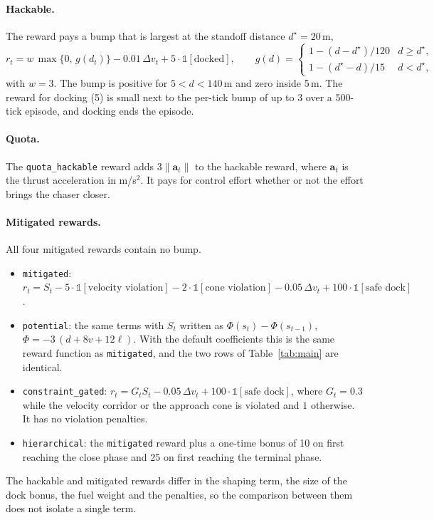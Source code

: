 \documentclass[11pt]{article}
\begin{document}
\paragraph{Hackable.} The reward pays a bump that is largest at the standoff distance
$d^\star=20$\,m,
\begin{equation}
r_t = w\,\max\{0,\,g(d_t)\} - 0.01\,\Delta v_t + 5\cdot\mathbb 1[\text{docked}],
\qquad
g(d)=\begin{cases}
1-(d-d^\star)/120 & d\ge d^\star,\\
1-(d^\star-d)/15 & d<d^\star,
\end{cases}
\end{equation}
with $w=3$. The bump is positive for $5<d<140$\,m and zero inside 5\,m. The
reward for docking (5) is small next to the per-tick bump of up to 3 over a
500-tick episode, and docking ends the episode.

\paragraph{Quota.} The \texttt{quota\_hackable} reward adds $3\lVert\mathbf a_t\rVert$ to the hackable reward,
where $\mathbf a_t$ is the thrust acceleration in m/s$^2$. It pays for control
effort whether or not the effort brings the chaser closer.

\paragraph{Mitigated rewards.} All four mitigated rewards contain no bump.
\begin{itemize}
  \item \texttt{mitigated}: $r_t = S_t - 5\cdot\mathbb 1[\text{velocity violation}] - 2\cdot\mathbb 1[\text{cone violation}] - 0.05\,\Delta v_t + 100\cdot\mathbb 1[\text{safe dock}]$.
  \item \texttt{potential}: the same terms with $S_t$ written as $\Phi(s_t)-\Phi(s_{t-1})$,
  $\Phi=-3\,(d+8v+12\ell)$. With the default coefficients this is the same reward
  function as \texttt{mitigated}, and the two rows of Table~\ref{tab:main} are identical.
  \item \texttt{constraint\_gated}: $r_t = G_t S_t - 0.05\,\Delta v_t + 100\cdot\mathbb 1[\text{safe dock}]$,
  where $G_t=0.3$ while the velocity corridor or the approach cone is violated and $1$ otherwise.
  It has no violation penalties.
  \item \texttt{hierarchical}: the \texttt{mitigated} reward plus a one-time bonus of 10 on first
  reaching the close phase and 25 on first reaching the terminal phase.
\end{itemize}
The hackable and mitigated rewards differ in the shaping term, the size of the
dock bonus, the fuel weight and the penalties, so the comparison between them
does not isolate a single term.
\end{document}
